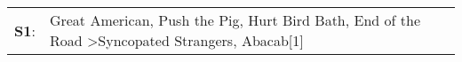 \begin{supertabular}{p{0.03\textwidth}p{0.92\textwidth}}
 \textbf{S1}:  &  Great American\textsuperscript{}, \enspace Push the Pig\textsuperscript{}, \enspace Hurt Bird Bath\textsuperscript{}, \enspace End of the Road\textsuperscript{} \textgreater \enspace Syncopated Strangers\textsuperscript{}, \enspace Abacab[1]\textsuperscript{}  \enspace  \\
\end{supertabular}
